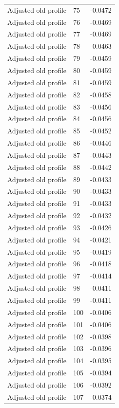 \begin{table}[htbp]
\begin{tabular}{lll}
Adjusted old profile & 75 & -0.0472 \\
Adjusted old profile & 76 & -0.0469 \\
Adjusted old profile & 77 & -0.0469 \\
Adjusted old profile & 78 & -0.0463 \\
Adjusted old profile & 79 & -0.0459 \\
Adjusted old profile & 80 & -0.0459 \\
Adjusted old profile & 81 & -0.0459 \\
Adjusted old profile & 82 & -0.0458 \\
Adjusted old profile & 83 & -0.0456 \\
Adjusted old profile & 84 & -0.0456 \\
Adjusted old profile & 85 & -0.0452 \\
Adjusted old profile & 86 & -0.0446 \\
Adjusted old profile & 87 & -0.0443 \\
Adjusted old profile & 88 & -0.0442 \\
Adjusted old profile & 89 & -0.0433 \\
Adjusted old profile & 90 & -0.0433 \\
Adjusted old profile & 91 & -0.0433 \\
Adjusted old profile & 92 & -0.0432 \\
Adjusted old profile & 93 & -0.0426 \\
Adjusted old profile & 94 & -0.0421 \\
Adjusted old profile & 95 & -0.0419 \\
Adjusted old profile & 96 & -0.0418 \\
Adjusted old profile & 97 & -0.0414 \\
Adjusted old profile & 98 & -0.0411 \\
Adjusted old profile & 99 & -0.0411 \\
Adjusted old profile & 100 & -0.0406 \\
Adjusted old profile & 101 & -0.0406 \\
Adjusted old profile & 102 & -0.0398 \\
Adjusted old profile & 103 & -0.0396 \\
Adjusted old profile & 104 & -0.0395 \\
Adjusted old profile & 105 & -0.0394 \\
Adjusted old profile & 106 & -0.0392 \\
Adjusted old profile & 107 & -0.0374 \\

\end{tabular}
\end{table}
